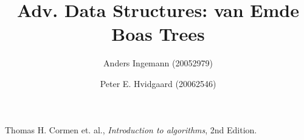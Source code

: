 \documentclass[12pt,a4paper]{report}
\title{Adv. Data Structures: van Emde Boas Trees}
\author{Anders Ingemann (20052979) \and Peter E. Hvidgaard (20062546)}
\begin{document}
\maketitle








\pagebreak
\begin{thebibliography}{3}

Thomas H. Cormen et. al.,
\emph{Introduction to algorithms},
2nd Edition.

\end{thebibliography}
\end{document}
